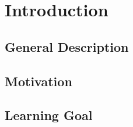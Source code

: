 \chapter{Introduction}\label{ch:introduction}

\section{General Description}\label{sec:general}

\section{Motivation}\label{sec:motivation}

\section{Learning Goal}\label{sec:goal}
